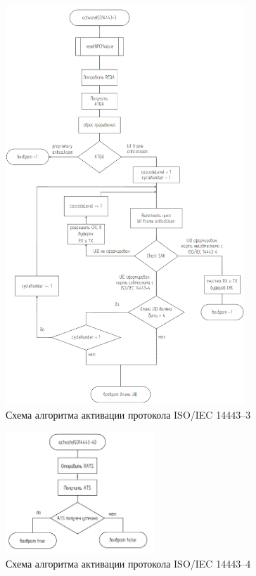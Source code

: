 \begin{figure}[H]
    \centering
    \includegraphics[width=0.8\textwidth]{images/design/activate_iso3}
    \caption{\centering Схема алгоритма активации протокола ISO/IEC 14443--3}
    \label{fig:activate_iso3}
\end{figure}

\begin{figure}[H]
    \centering
    \includegraphics[width=0.5\textwidth]{images/design/activate_iso4}
    \caption{\centering Схема алгоритма активации протокола ISO/IEC 14443--4}
    \label{fig:activate_iso4}
\end{figure}

